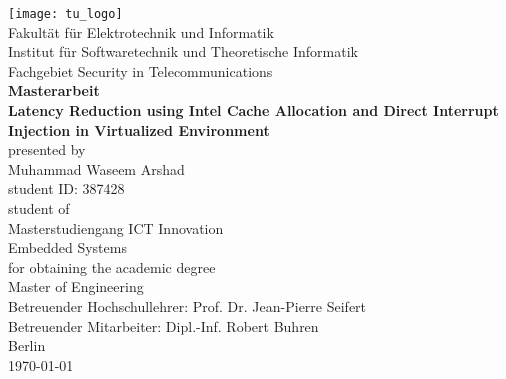 \begin{titlepage}
    \begin{center}
        \vspace*{0.5cm}

        \texttt{[image: tu\_logo]} \\
		\vspace{0.25cm}
		\textnormal{Fakult{\"a}t f{\"u}r Elektrotechnik und Informatik} \\
		\textnormal{Institut f{\"u}r Softwaretechnik und Theoretische Informatik} \\
		\textnormal{Fachgebiet Security in Telecommunications} \\
		\vspace{1.0cm}
		\textbf{\Large{Masterarbeit}}\\
		\vspace{1.0cm}
		\textbf{\LARGE{Latency Reduction using Intel Cache Allocation and Direct Interrupt Injection in Virtualized Environment}} \\
		\vspace{1.5cm}
		\textnormal{\large{presented by}} \\
        \textnormal{\Large{Muhammad Waseem Arshad}} \\
        \textnormal{\large{student ID: 387428}} \\
		\textnormal{\large{student of}}\\ 
		\textnormal{\Large{Masterstudiengang ICT Innovation}} \\
		\textnormal{\large{Embedded Systems}} \\
		\vspace{1.0cm}
		\textnormal{\large{for obtaining the academic degree}} \\
		\textnormal{\Large{Master of Engineering}} \\
		\vspace{3cm}
		\textnormal{\large{Betreuender Hochschullehrer: Prof. Dr. Jean-Pierre Seifert}} \\
		\textnormal{\large{Betreuender Mitarbeiter: Dipl.-Inf. Robert Buhren}} \\
		\vspace{2cm}
		\textnormal{\Large{Berlin}}\\
		\textnormal{\Large{\today}}\\
        
    \end{center}
\end{titlepage}
